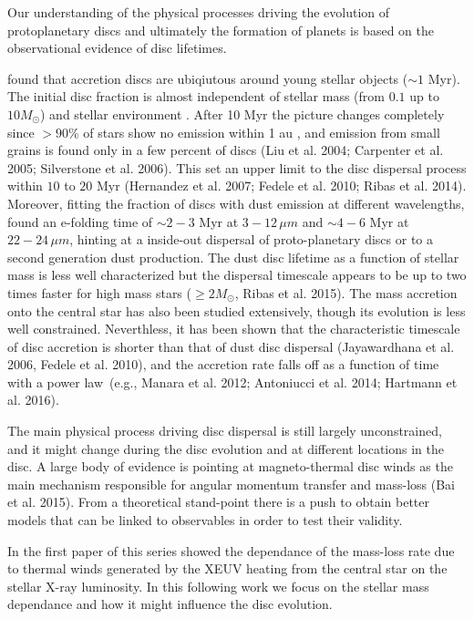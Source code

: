 \documentclass{aa}
\begin{document}
Our understanding of the physical processes driving the evolution of protoplanetary discs and ultimately the formation of planets is based on the observational evidence of disc lifetimes.

 found that accretion discs are ubiqiutous around young stellar objects ($\sim 1$ Myr). The initial disc fraction is almost independent of stellar mass (from $0.1$ up to $10 M_\odot$) and stellar environment .
After 10 Myr the picture changes completely since $> 90\%$ of stars show no emission within 1 au , and emission from small grains is found only in a few percent of discs (Liu et al. 2004; Carpenter et al. 2005; Silverstone et al. 2006).
This set an upper limit to the disc dispersal process within $10$ to $20$ Myr (Hernandez et al. 2007; Fedele et al. 2010; Ribas et al. 2014). Moreover, fitting the fraction of discs with dust emission at different wavelengths,  found an e-folding time of $\sim2-3$ Myr at $3-12\, \mu m$ and $\sim4-6$ Myr at $22-24\, \mu m$, hinting at a inside-out dispersal of proto-planetary discs or to a second generation dust production.
The dust disc lifetime as a function of stellar mass is less well characterized but the dispersal timescale appears to be up to two times faster for high mass stars ($\geq 2 M_\odot$, Ribas et al. 2015).
The mass accretion onto the central star has also been studied extensively, though its evolution is less well constrained. Neverthless, it has been shown that the characteristic timescale of disc accretion is shorter than that of dust disc dispersal (Jayawardhana et al. 2006, Fedele et al. 2010), and the accretion rate falls off as a function of time with a power law (e.g., Manara et al. 2012; Antoniucci et al. 2014; Hartmann et al. 2016).

The main physical process driving disc dispersal is still largely unconstrained, and it might change during the disc evolution and at different locations in the disc. A large body of evidence is pointing at magneto-thermal disc winds as the main mechanism responsible for angular momentum transfer and mass-loss (Bai et al. 2015). From a theoretical stand-point there is a push to obtain better models that can be linked to observables in order to test their validity.

In the first paper of this series  showed the dependance of the mass-loss rate due to thermal winds generated by the XEUV heating from the central star on the stellar X-ray luminosity. In this following work we focus on the stellar mass dependance and how it might influence the disc evolution.
\end{document}
